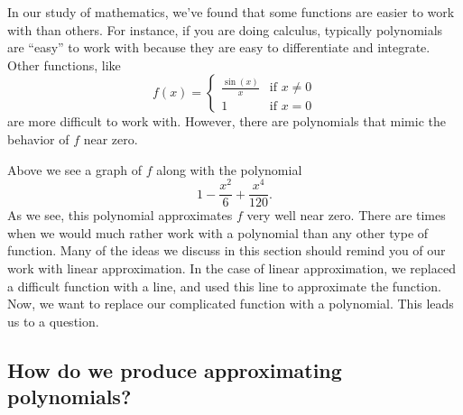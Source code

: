 \documentclass{ximera}
\begin{document}
In our study of mathematics, we've found that some functions are
easier to work with than others. For instance, if you are doing
calculus, typically polynomials are ``easy'' to work with because they
are easy to differentiate and integrate. Other functions, like
\[
f(x) =
\begin{cases}
  \frac{\sin(x)}{x} &\text{if $x\ne 0$}\\
  1 &\text{if $x=0$}
\end{cases}
\]
are more difficult to work with. However, there are
polynomials that mimic the behavior of $f$ near zero.
\begin{image}
\end{image}
Above we see a graph of $f$ along with the polynomial
\[
1-\frac{x^2}{6}+\frac{x^4}{120}.
\]
As we see, this polynomial approximates $f$ very well near zero.  There are times 
when we would much rather work with a polynomial than any other type of function. 
Many of the ideas we discuss in this section should remind you of our work with 
linear approximation.  In the case of linear approximation, we replaced a difficult 
function with a line, and used this line to approximate the function.  Now, we want to 
replace our complicated function with a polynomial. This leads us to a question.


\subsection{How do we produce approximating polynomials?}
\end{document}
